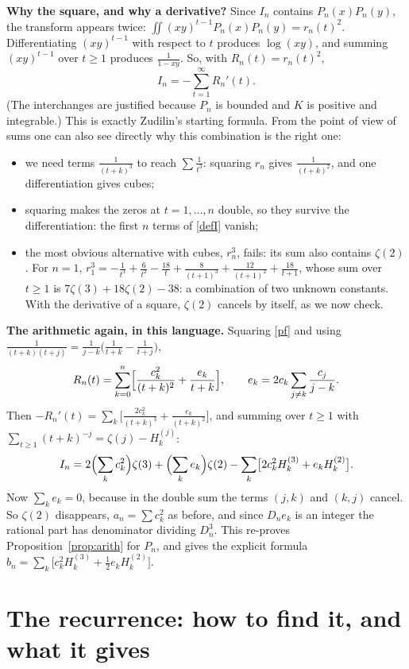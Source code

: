 \documentclass[11pt]{article}
\theoremstyle{remark}
\newcommand{\q}[1]{\medskip\noindent\textbf{#1}}
\begin{document}
\q{Why the square, and why a derivative?} Since $I_n$ contains $P_n(x)P_n(y)$, the transform
appears twice: $\iint(xy)^{t-1}P_n(x)P_n(y)=r_n(t)^2$. Differentiating $(xy)^{t-1}$ with respect to
$t$ produces $\log(xy)$, and summing $(xy)^{t-1}$ over $t\ge1$ produces $\frac1{1-xy}$. So, with
$R_n(t)=r_n(t)^2$,
\begin{equation}\label{defI}
I_n=-\sum_{t=1}^\infty R_n'(t).
\end{equation}
(The interchanges are justified because $P_n$ is bounded and $K$ is positive and integrable.) This
is exactly Zudilin's starting formula. From the point of view of sums one can also see directly
why this combination is the right one:
\begin{itemize}
\item we need terms $\frac1{(t+k)^3}$ to reach $\sum\frac1{t^3}$: squaring $r_n$ gives
$\frac1{(t+k)^2}$, and one differentiation gives cubes;
\item squaring makes the zeros at $t=1,\dots,n$ double, so they survive the differentiation: the
first $n$ terms of \eqref{defI} vanish;
\item the most obvious alternative with cubes, $r_n^3$, fails: its sum also contains $\zeta(2)$.
For $n=1$, $r_1^3=-\frac1{t^3}+\frac6{t^2}-\frac{18}t+\frac8{(t+1)^3}+\frac{12}{(t+1)^2}+\frac{18}{t+1}$,
whose sum over $t\ge1$ is $7\zeta(3)+18\zeta(2)-38$: a combination of two unknown constants. With
the derivative of a square, $\zeta(2)$ cancels by itself, as we now check.
\end{itemize}

\q{The arithmetic again, in this language.} Squaring \eqref{pf} and using
$\frac1{(t+k)(t+j)}=\frac1{j-k}\bigl(\frac1{t+k}-\frac1{t+j}\bigr)$,
\[
R_n(t)=\sum_{k=0}^n\Bigl[\frac{c_k^2}{(t+k)^2}+\frac{e_k}{t+k}\Bigr],\qquad
e_k=2c_k\sum_{j\ne k}\frac{c_j}{j-k}.
\]
Then $-R_n'(t)=\sum_k\bigl[\frac{2c_k^2}{(t+k)^3}+\frac{e_k}{(t+k)^2}\bigr]$, and summing over
$t\ge1$ with $\sum_{t\ge1}(t+k)^{-j}=\zeta(j)-H_k^{(j)}$:
\[
I_n=2\Bigl(\sum_kc_k^2\Bigr)\zeta(3)+\Bigl(\sum_ke_k\Bigr)\zeta(2)
-\sum_k\bigl[2c_k^2H_k^{(3)}+e_kH_k^{(2)}\bigr].
\]
Now $\sum_ke_k=0$, because in the double sum the terms $(j,k)$ and $(k,j)$ cancel. So $\zeta(2)$
disappears, $a_n=\sum c_k^2$ as before, and since $D_ne_k$ is an integer the rational part has
denominator dividing $D_n^3$. This re-proves Proposition~\ref{prop:arith} for $P_n$, and gives the
explicit formula $b_n=\sum_k\bigl[c_k^2H_k^{(3)}+\tfrac12e_kH_k^{(2)}\bigr]$.

\section{The recurrence: how to find it, and what it gives}
\end{document}
